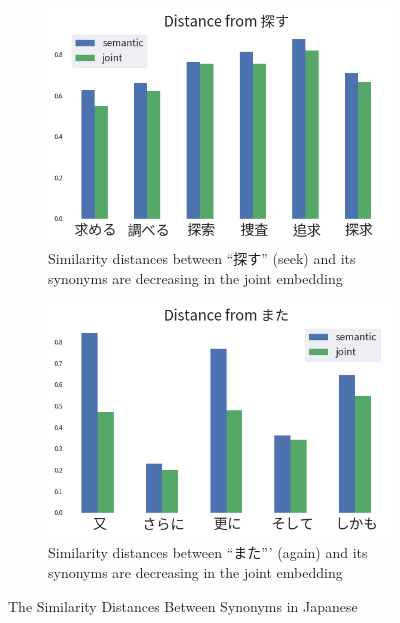 \begin{CJK}{UTF8}{long}
\begin{figure}[h]
\begin{subfigure}[b]{0.49\textwidth}
            \label{fig:similarity_ja2}
        \end{subfigure}
        \begin{subfigure}[b]{0.49\textwidth}
            \centering
            \includegraphics[width=\textwidth]{../images/similarity_ja3.png}
            \caption{Similarity distances between ``探す'' (seek) and its synonyms are decreasing in the joint embedding}
            \label{fig:similarity_ja3}
        \end{subfigure}
        \begin{subfigure}[b]{0.49\textwidth}
            \centering
            \includegraphics[width=\textwidth]{../images/similarity_ja4.png}
            \caption{Similarity distances between ``また''' (again) and its synonyms are decreasing in the joint embedding}
            \label{fig:similarity_ja4}
        \end{subfigure}
        \caption{The Similarity Distances Between Synonyms in Japanese}
        \label{fig:similarity_ja}
    \end{figure}
    \end{CJK}

